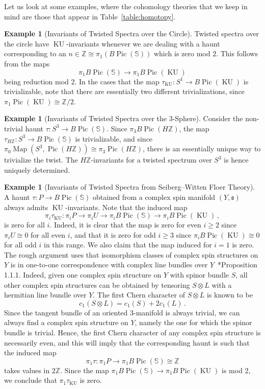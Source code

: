 \documentclass[10pt]{amsart}
\newcommand{\longto}{\longrightarrow}
\theoremstyle{plain}
\theoremstyle{definition}
\newtheorem{example}[theorem]{Example}
\DeclareMathOperator{\Pic}{Pic}
\DeclareMathOperator{\Map}{Map}
\DeclareMathOperator{\KU}{KU}
\newcommand{\bS}{\mathbb{S}}
\newcommand{\bZ}{\mathbb{Z}}
\begin{document}
Let us look at some examples, where the cohomology theories that we keep in mind are those that appear in Table~\ref{table:homotopy}.

\begin{example}[Invariants of Twisted Spectra over the Circle]
  Twisted spectra over the circle have $\KU$-invariants whenever we are dealing with a haunt corresponding to an $n \in \bZ \cong \pi_1(B\Pic(\bS))$ which is zero mod $2$.
  This follows from the maps
  \[
  \pi_1 B\Pic(\bS) \longto \pi_1 B\Pic(\KU)
  \]
  being reduction mod $2$.
  In the cases that the map $\tau_{\KU} : S^1 \to B\Pic(\KU)$ is trivializable, note that there are essentially two different trivializations, since $\pi_1 \Pic(\KU) \cong \bZ/ 2$.
\end{example}

\begin{example}[Invariants of Twisted Spectra over the 3-Sphere]
  Consider the non-trivial haunt $\tau : S^3 \to B\Pic(\bS)$.
  Since $\pi_3 B\Pic(H\bZ)$, the map $\tau_{H\bZ} : S^3 \to B\Pic(\bS)$ is trivializable, and since $\pi_0 \Map(S^3,\Pic(H\bZ)) \cong \pi_3 \Pic(H\bZ)$, there is an essentially unique way to trivialize the twist. The $H\bZ$-invariants for a twisted spectrum over $S^3$ is hence uniquely determined.
\end{example}

\begin{example}[Invariants of Twisted Spectra from Seiberg--Witten Floer Theory]
  A haunt $\tau : P \to B\Pic(\bS)$ obtained from a complex spin manifold $(Y,\mathfrak{s})$ always admits $\KU$-invariants.
  Note that the induced map
  \[
  \pi_i \tau_{\KU} : \pi_i P \longto \pi_i U \longto \pi_i B\Pic(\bS) \longto \pi_i B\Pic(\KU) \,,
  \]
  is zero for all $i$.
  Indeed, it is clear that the map is zero for even $i \geq 2$ since $\pi_i U \cong 0$ for all even $i$, and that it is zero for odd $i\geq 3$ since $\pi_i B\Pic(\KU) \cong 0$ for all odd $i$ in this range.
  We also claim that the map induced for $i=1$ is zero.
  The rough argument uses that isomorphism classes of complex spin structures on $Y$ is in one-to-one correspondence with complex line bundles over $Y$~\cite{KM07}*{Proposition 1.1.1}.
  Indeed, given one complex spin structure on $Y$ with spinor bundle $S$, all other complex spin structures can be obtained by tensoring $S \otimes L$ with a hermitian line bundle over $Y$.
  The first Chern character of $S \otimes L$ is known to be
  \[
  c_1(S \otimes L) = c_1(S) + 2 c_1(L) \,.
  \]
  Since the tangent bundle of an oriented 3-manifold is always trivial, we can always find a complex spin structure on $Y$, namely the one for which the spinor bundle is trivial.
  Hence, the first Chern character of any complex spin structure is necessarily even, and this will imply that the corresponding haunt is such that the induced map
  \[
  \pi_1 \tau : \pi_1 P \longto \pi_1 B\Pic(\bS) \cong \bZ
  \]
  takes values in $2\bZ$. Since the map $\pi_1 B\Pic(\bS) \to \pi_1 B\Pic(\KU)$ is mod 2, we conclude that $\pi_1 \tau_{\KU}$ is zero.
\end{example}
\end{document}
